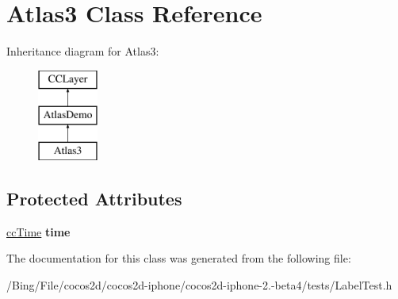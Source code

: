 \hypertarget{interface_atlas3}{\section{Atlas3 Class Reference}
\label{interface_atlas3}
}
Inheritance diagram for Atlas3\-:\begin{figure}[H]
\begin{center}
\leavevmode
\includegraphics[height=3.000000cm]{interface_atlas3}
\end{center}
\end{figure}
\subsection*{Protected Attributes}
\begin{DoxyCompactItemize}
\item 
\hypertarget{interface_atlas3_a628cd488f4142d43ce60f74539b627bb}{\hyperlink{cc_types_8h_ae6c674aac4bfb46a4e6cb1e89bb66b4f}{cc\-Time} {\bfseries time}}\label{interface_atlas3_a628cd488f4142d43ce60f74539b627bb}

\end{DoxyCompactItemize}


The documentation for this class was generated from the following file\-:\begin{DoxyCompactItemize}
\item 
/\-Bing/\-File/cocos2d/cocos2d-\/iphone/cocos2d-\/iphone-\/2.-\/beta4/tests/Label\-Test.\-h\end{DoxyCompactItemize}
